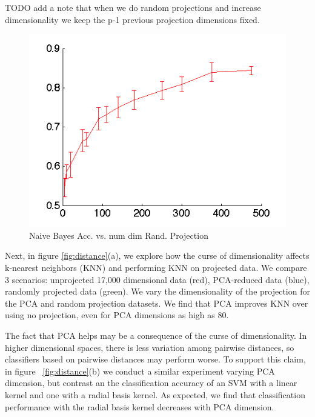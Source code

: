 TODO add a note that when we do random projections and increase dimensionality we keep the p-1 previous projection dimensions fixed. 

\begin{center}
\begin{figure}[!ht]
\centering
\includegraphics[width=.5\textwidth]{../images/accuracy_vs_dim_randproj.png}
\caption{Naive Bayes Acc. vs. num dim Rand. Projection}
\label{fig:nb_rand_proj}
\end{figure}
\end{center}


	Next, in figure \ref{fig:distance}(a), we explore how the curse of dimensionality affects k-nearest neighbors (KNN) and performing KNN on projected data. We compare 3 scenarios: unprojected 17,000 dimensional data (red), PCA-reduced data (blue), randomly projected data (green). We vary the dimensionality of the projection for the PCA and random projection datasets. We find that  PCA improves KNN over using no projection, even for PCA dimensions as high as 80. 

	The fact that PCA helps may be a consequence of the curse of dimensionality. In higher dimensional spaces, there is less variation among pairwise distances, so classifiers based on pairwise distances may perform worse. To support this claim, in figure ~\ref{fig:distance}(b) we conduct a similar experiment varying PCA dimension, but contrast an the classification accuracy of an SVM with a linear kernel and one with a radial basis kernel. As expected, we find that classification performance with the radial basis kernel decreases with PCA dimension. 

